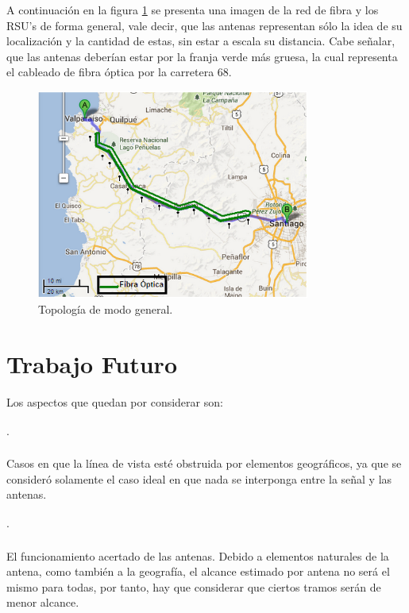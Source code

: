 \documentclass[12pt]{article}
\begin{document}
\newpage
A continuación en la figura \ref{fig:map_ant} se presenta una imagen de la red de fibra y los RSU's 
de forma general, vale decir, que las antenas representan 
sólo la idea de su localización y la cantidad de estas, sin estar a escala su distancia. Cabe señalar, 
que las antenas deberían estar por la franja verde más gruesa, la cual representa el cableado de fibra óptica 
por la carretera 68.\\

\begin{figure}[H]
  \centering
      \includegraphics[width=0.8\textwidth]{map_ant}
	    \caption{Topología de modo general.}
	\label{fig:map_ant}
\end{figure}

\newpage
\section{Trabajo Futuro}
Los aspectos que quedan por considerar son:\\
\paragraph{$\cdot$}Casos en que la línea de vista esté obstruida por elementos geográficos, ya que se 
consideró solamente el caso ideal en que nada se interponga entre la señal y las antenas.
\paragraph{$\cdot$}El funcionamiento acertado de las antenas. Debido a elementos naturales de la antena, 
como también a la geografía, el alcance estimado por antena no será el mismo para todas, por tanto, hay 
que considerar que ciertos tramos serán de menor alcance.
\end{document}
